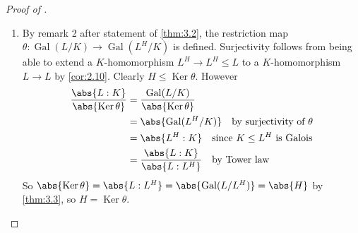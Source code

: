\documentclass{article}
\DeclareMathOperator{\Gal}{Gal}
\DeclareMathOperator{\Ker}{Ker}
\begin{document}
\begin{proof}[Proof of ]
\begin{enumerate}[label=(\roman*)]
        \item By remark 2 after statement of \cref{thm:3.2}, the restriction map $\theta:\Gal(L/K) \rightarrow \Gal(L^H/K)$ is defined.
            Surjectivity follows from being able to extend a $K$-homomorphism $L^H \to L^H \leq L$ to a $K$-homomorphism $L \to L$ by \cref{cor:2.10}.
            Clearly $H \leq \Ker \theta$. However
            \begin{align*}
                \frac{\abs{L:K}}{\abs{\Ker \theta}} &= \frac{\Gal(L/K)}{\abs{\Ker \theta}} \\
                                                    &= \abs{\Gal(L^H/K)} \quad \text{by surjectivity of } \theta \\
                                                    &= \abs{L^H:K} \quad \text{since } K \leq L^H \text{ is Galois} \\
                                                    &= \frac{\abs{L:K}}{\abs{L:L^H}} \quad \text{by Tower law}
            \end{align*}
            So $\abs{\Ker \theta} = \abs{L:L^H} = \abs{\Gal(L/L^H)} = \abs{H}$ by \cref{thm:3.3}, so $H = \Ker \theta$.
    \end{enumerate}
\end{proof}
\end{document}
